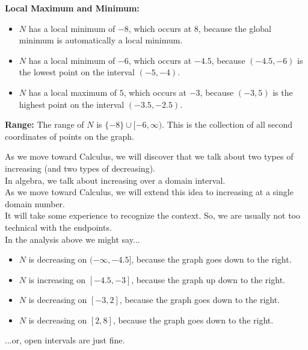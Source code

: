 \documentclass{ximera}
\begin{document}
\begin{example}
\textbf{Local Maximum and Minimum:} 

\begin{itemize}
     \item $N$ has a local minimum of $-8$, which occurs at $8$, because the global minimum is automatically a local minimum.
     \item $N$ has a local minimum of $-6$, which occurs at $-4.5$, because $(-4.5, -6)$ is the lowest point on the interval $(-5, -4)$.
     \item $N$ has a local maximum of $5$, which occurs at $-3$, because $(-3, 5)$ is the highest point on the interval $(-3.5, -2.5)$.

\end{itemize}

\textbf{Range:} The range of $N$ is $\{ -8 \} \cup [-6, \infty)$. This is the collection of all second coordinates of points on the graph.\\ 


\end{example}



\begin{observation}

As we move toward Calculus, we will discover that we talk about two types of increasing (and two types of decreasing). \\

In algebra, we talk about increasing over a domain interval. \\

As we move toward Calculus, we will extend this idea to increasing at a single domain number. \\


It will take some experience to recognize the context.  So, we are usually not too technical with the endpoints. \\

In the analysis above we might say...


\begin{itemize}
     \item $N$ is decreasing on $(-\infty, -4.5]$, because the graph goes down to the right.
     \item $N$ is increasing on $[-4.5, -3]$, because the graph up down to the right.
     \item $N$ is decreasing on $[-3, 2]$, because the graph goes down to the right.
     \item $N$ is decreasing on $[2, 8]$, because the graph goes down to the right.
\end{itemize}


...or, open intervals are just fine.



\end{observation}
\end{document}
